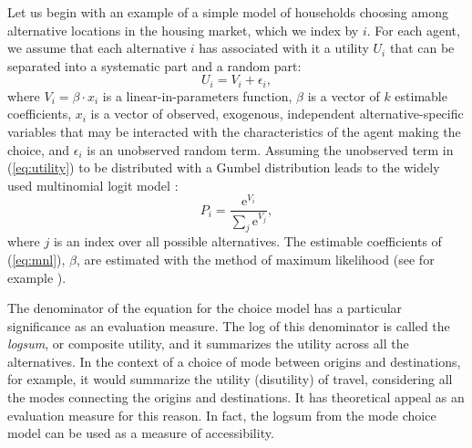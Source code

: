 Let us begin with an example of a simple model of households choosing among
alternative locations in the housing market, which we index by
$i$. For each agent, we assume that each alternative $i$ has
associated with it a utility $U_i$ that can be separated into a
systematic part and a random part:
\begin{equation}
    U_i = V_i + \epsilon_i,
    \label{eq:utility}
\end{equation}
where $V_i = \beta\cdot {x}_i$ is a linear-in-parameters
function, $\beta$ is a vector of $k$ estimable coefficients,
$x_i$ is a vector of observed, exogenous, independent
alternative-specific variables that may be interacted with the
characteristics of the agent making the choice, and $\epsilon_i$
is an unobserved random term. Assuming the unobserved term in
(\ref{eq:utility}) to be distributed with a Gumbel distribution
leads to the  widely used multinomial logit model
\cite{mcfadden-1974,mcfadden-1981}:
\begin{equation}
    P_i = \frac{\mathrm{e}^{V_i}}{\sum_j \mathrm{e}^{V_j}},
    \label{eq:mnl}
\end{equation}
where $j$ is an index over all possible alternatives. The
estimable coefficients of (\ref{eq:mnl}), $\beta$, are
estimated with the method of maximum likelihood (see for example
\cite{Greene-2002}).

The denominator of the equation for the choice model has a particular
significance as an evaluation measure.  The log of this denominator
is called the \emph{logsum}, or composite utility, and it summarizes
the utility across all the alternatives.  In the context of a choice of
mode between origins and destinations, for example, it would summarize
the utility (disutility) of travel, considering all the modes connecting the
origins and destinations.  It has theoretical appeal as an evaluation
measure for this reason.  In fact, the logsum from the mode choice
model can be used as a measure of accessibility.

